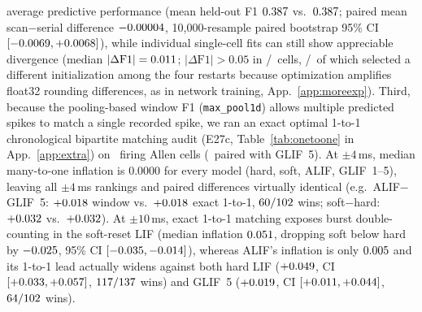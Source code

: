 \documentclass[10pt]{article}
\theoremstyle{remark}
\begin{document}
average predictive performance (mean held-out F1 $0.387$ vs.\ $0.387$; paired mean scan$-$serial difference ${-}0.00004$, 10{,}000-resample paired bootstrap 95\% CI $[{-}0.0069,+0.0068]$), while individual single-cell fits can still show appreciable divergence (median $|\Delta\mathrm{F1}|=0.011$; $|\Delta\mathrm{F1}|>0.05$ in \EqBigDiff/\EqCells\ cells, \EqBigDiffInit/\EqBigDiff\ of which selected a different initialization among the four restarts because optimization amplifies float32 rounding differences, as in network training, App.~\ref{app:moreexp}).
Third, because the pooling-based window F1 (\texttt{max\_pool1d}) allows multiple predicted spikes to match a single recorded spike, we ran an exact optimal 1-to-1 chronological bipartite matching audit (E27c, Table~\ref{tab:onetoone} in App.~\ref{app:extra}) on \OneToOneNAll\ firing Allen cells (\OneToOneNGFive\ paired with GLIF~5). At $\pm 4$\,ms, median many-to-one inflation is $0.0000$ for every model (hard, soft, ALIF, GLIF~1--5), leaving all $\pm 4$\,ms rankings and paired differences virtually identical (e.g.\ ALIF$-$GLIF~5: $+0.018$ window vs.\ $+0.018$ exact 1-to-1, $60/102$ wins; soft$-$hard: $+0.032$ vs.\ $+0.032$). At $\pm 10$\,ms, exact 1-to-1 matching exposes burst double-counting in the soft-reset LIF (median inflation $0.051$, dropping soft below hard by ${-}0.025$, 95\% CI $[{-}0.035,{-}0.014]$), whereas ALIF's inflation is only $0.005$ and its 1-to-1 lead actually widens against both hard LIF ($+0.049$, CI $[+0.033,+0.057]$, $117/137$ wins) and GLIF~5 ($+0.019$, CI $[+0.011,+0.044]$, $64/102$ wins).
\end{document}

